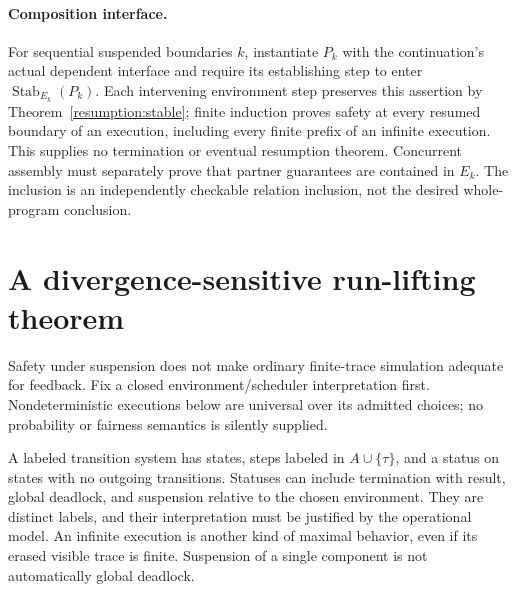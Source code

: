 \documentclass[11pt]{article}
\newcommand{\Stab}{\operatorname{Stab}}
\begin{document}
\paragraph{Composition interface.} For sequential suspended boundaries $k$, instantiate $P_k$ with the continuation's actual dependent interface and require its establishing step to enter $\Stab_{E_k}(P_k)$. Each intervening environment step preserves this assertion by Theorem~\ref{resumption:stable}; finite induction proves safety at every resumed boundary of an execution, including every finite prefix of an infinite execution. This supplies no termination or eventual resumption theorem. Concurrent assembly must separately prove that partner guarantees are contained in $E_k$. The inclusion is an independently checkable relation inclusion, not the desired whole-program conclusion.

\section{A divergence-sensitive run-lifting theorem}
Safety under suspension does not make ordinary finite-trace simulation adequate for feedback. Fix a closed environment/scheduler interpretation first. Nondeterministic executions below are universal over its admitted choices; no probability or fairness semantics is silently supplied.

A labeled transition system has states, steps labeled in $A\cup\{\tau\}$, and a status on states with no outgoing transitions. Statuses can include termination with result, global deadlock, and suspension relative to the chosen environment. They are distinct labels, and their interpretation must be justified by the operational model. An infinite execution is another kind of maximal behavior, even if its erased visible trace is finite. Suspension of a single component is not automatically global deadlock.
\end{document}
